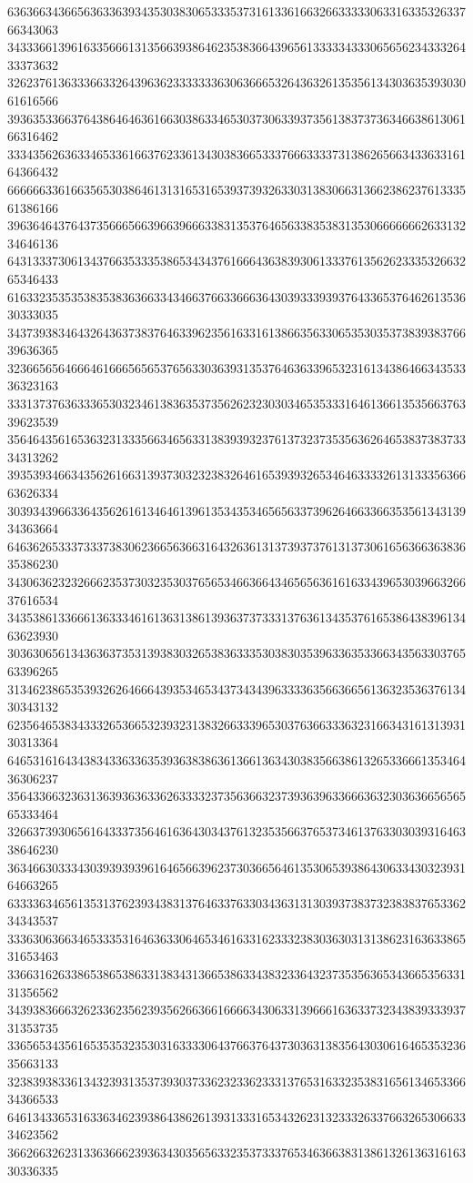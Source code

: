 63636634366563633639343530383065333537316133616632663333306331633532633766343063
34333661396163356661313566393864623538366439656133333433306565623433326433373632
32623761363336633264396362333333363063666532643632613535613430363539303061616566
39363533663764386464636166303863346530373063393735613837373634663861306166316462
33343562636334653361663762336134303836653337666333373138626566343363316164366432
66666633616635653038646131316531653937393263303138306631366238623761333561386166
39636464376437356665663966396663383135376465633835383135306666666263313234646136
64313337306134376635333538653434376166643638393061333761356262333532663265346433
61633235353538353836366334346637663366636430393339393764336537646261353630333035
34373938346432643637383764633962356163316138663563306535303537383938376639636365
32366565646664616665656537656330363931353764636339653231613438646634353336323163
33313737636333653032346138363537356262323030346535333164613661353566376339623539
35646435616536323133356634656331383939323761373237353563626465383738373334313262
39353934663435626166313937303232383264616539393265346463333261313335636663626334
30393439663364356261613464613961353435346565633739626466336635356134313934363664
64636265333733373830623665636631643263613137393737613137306165636636383635386230
34306362323266623537303235303765653466366434656563616163343965303966326637616534
34353861336661363334616136313861393637373331376361343537616538643839613463623930
30363065613436363735313938303265383633353038303539633635336634356330376563396265
31346238653539326264666439353465343734343963333635663665613632353637613430343132
62356465383433326536653239323138326633396530376366333632316634316131393130313364
64653161643438343363363539363838636136613634303835663861326533666135346436306237
35643366323631363936363362633332373563663237393639633666363230363665656565333464
32663739306561643337356461636430343761323535663765373461376330303931646338646230
36346630333430393939396164656639623730366564613530653938643063343032393164663265
63333634656135313762393438313764633763303436313130393738373238383765336234343537
33363063663465333531646363306465346163316233323830363031313862316363386531653463
33663162633865386538633138343136653863343832336432373535636534366535633131356562
34393836663262336235623935626636616666343063313966616363373234383933393731353735
33656534356165353532353031633330643766376437303631383564303061646535323635663133
32383938336134323931353739303733623233623331376531633235383165613465336634366533
64613433653163363462393864386261393133316534326231323332633766326530663334623562
36626632623133636662393634303565633235373337653463663831386132613631616330336335

